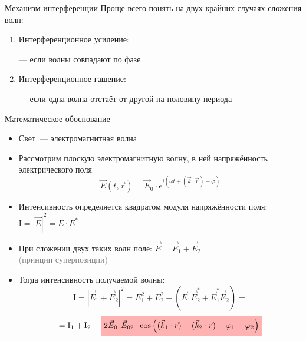 \documentclass[usenames,dvipsnames,pdftex,unicode,hidelinks]{beamer}
\newcommand{\I}{\mathrm{I}} %
\newcommand{\muted}[1]{\textcolor{gray}{#1}}
\newcommand{\vect}[1]{\vec{#1}} %
\newcommand{\conj}[1]{#1^*} %
\renewcommand{\phi}{\varphi} %
\newcommand{\mathalert}[1]{
    \tikz[baseline]{
      \node [fill=red!30,anchor=base] {$ #1 $};
    }
  }
\begin{document}
  \begin{frame}{Механизм интерференции}
    Проще всего понять на двух крайних случаях сложения волн:
    \vspace{5mm}
    \begin{enumerate}
      \item<1> Интерференционное усиление:
        --- если волны совпадают по фазе
        \vspace{5mm}
      \item<2> Интерференционное гашение:
        --- если одна волна отстаёт от другой на половину периода
    \end{enumerate}
  \end{frame}

  \begin{frame}{Математическое обоснование}

    \begin{itemize}[<+->]
      \item Свет~--- электромагнитная волна
      \item Рассмотрим плоскую электромагнитную волну, в ней напряжённость электрического поля
        \[
          \vect{E}(t, \vect{r}) = \vect{E}_0 \cdot e^{i(\omega t + (\vect{k}\cdot\vect{r}) + \phi)}
        \]
      \item Интенсивность определяется квадратом модуля напряжённости поля: $\I = |\vect{E}|^2 = E\cdot\conj{E}$
      \item При сложении двух таких волн поле: $\vect{E} = \vect{E}_1 + \vect{E}_2$ \\ \muted{(принцип суперпозиции)}
      \item Тогда интенсивность получаемой волны:
        \[
          \I = |\vect{E}_1 + \vect{E}_2|^2 = E_1^2 + E_2^2 + (\vect{E}_1\conj{\vect{E}_2} + \conj{\vect{E}_1}\vect{E}_2) =
        \]\[
          = \I_1 + \I_2 + \mathalert{2 \vect{E}_{01} \vect{E}_{02} \cdot \cos \left( (\vect{k}_1\cdot\vect{r}) -
            (\vect{k}_2\cdot\vect{r}) + \phi_1 - \phi_2 \right)}
        \]
    \end{itemize}
    
  \end{frame}
\end{document}
